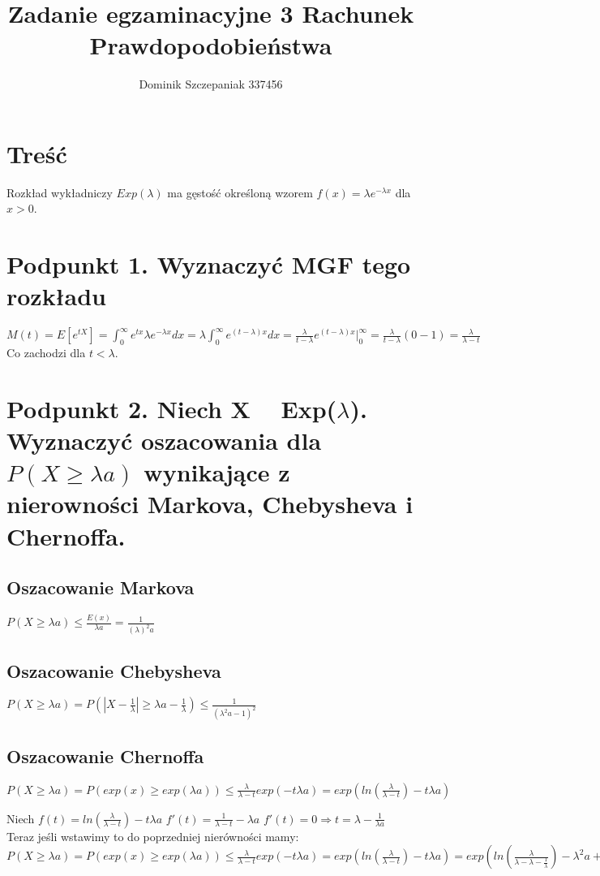 \documentclass[14pt, a4paper]{article}
\title{Zadanie egzaminacyjne 3 Rachunek Prawdopodobieństwa}
\author{Dominik Szczepaniak 337456}
\begin{document}
\maketitle

\bgroup\obeylines

\section{Treść}
Rozkład wykładniczy $Exp(\lambda)$ ma gęstość określoną wzorem $f(x) = \lambda e^{-\lambda x}$ dla $x > 0$.

\section{Podpunkt 1. Wyznaczyć MGF tego rozkładu}
$M(t) = E[e^{tX}] = \int_{0}^{\infty} e^{tx} \lambda e^{-\lambda x} dx = \lambda \int_{0}^{\infty} e^{(t-\lambda)x} dx = \frac{\lambda}{t-\lambda} e^{(t-\lambda)x} \Big|_{0}^{\infty} = \frac{\lambda}{t-\lambda} (0 - 1) = \frac{\lambda}{\lambda - t}$
Co zachodzi dla $t < \lambda$.

\section{Podpunkt 2. Niech X ~ Exp($\lambda$). Wyznaczyć oszacowania dla $P(X \geq \lambda a)$ wynikające z nierowności Markova, Chebysheva i Chernoffa.}

\subsection{Oszacowanie Markova}
$P(X \geq \lambda a) \leq \frac{E(x)}{\lambda a} = \frac{1}{(\lambda)^2 a}$

\subsection{Oszacowanie Chebysheva}
$P(X \geq \lambda a) = P(|X - \frac{1}{\lambda}| \geq \lambda a - \frac{1}{\lambda}) \leq \frac{1}{(\lambda^2a - 1)^2}$

\subsection{Oszacowanie Chernoffa}
$P(X \geq \lambda a) = P(exp(x) \geq exp(\lambda a)) \leq \frac{\lambda}{\lambda - t} exp(-t \lambda a) = exp(ln(\frac{\lambda}{\lambda - t}) - t \lambda a)$

Niech $f(t) = ln(\frac{\lambda}{\lambda - t}) - t \lambda a$
$f'(t) = \frac{1}{\lambda - t} - \lambda a$
$f'(t) = 0 \Rightarrow t = \lambda - \frac{1}{\lambda a}$
Teraz jeśli wstawimy to do poprzedniej nierówności mamy:
$P(X \geq \lambda a) = P(exp(x) \geq exp(\lambda a)) \leq \frac{\lambda}{\lambda - t} exp(-t \lambda a) = exp(ln(\frac{\lambda}{\lambda - t}) - t \lambda a) = exp(ln(\frac{\lambda}{\lambda - \lambda - \frac{1}{\lambda}}) - \lambda^2 a + 1) = a\lambda^2exp(-\lambda^2 a + 1)$
\end{document}
